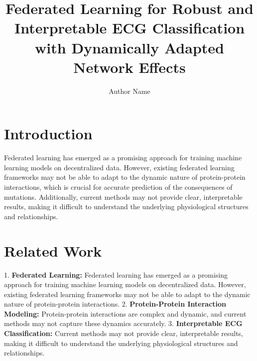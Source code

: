 \documentclass{article}
\begin{document}
\title{Federated Learning for Robust and Interpretable ECG Classification with Dynamically Adapted Network Effects}

\author{Author Name}

\maketitle


\section{Introduction}

Federated learning has emerged as a promising approach for training machine learning models on decentralized data. However, existing federated learning frameworks may not be able to adapt to the dynamic nature of protein-protein interactions, which is crucial for accurate prediction of the consequences of mutations. Additionally, current methods may not provide clear, interpretable results, making it difficult to understand the underlying physiological structures and relationships.

\section{Related Work}

1.  \textbf{Federated Learning:} Federated learning has emerged as a promising approach for training machine learning models on decentralized data. However, existing federated learning frameworks may not be able to adapt to the dynamic nature of protein-protein interactions.
2.  \textbf{Protein-Protein Interaction Modeling:} Protein-protein interactions are complex and dynamic, and current methods may not capture these dynamics accurately.
3.  \textbf{Interpretable ECG Classification:} Current methods may not provide clear, interpretable results, making it difficult to understand the underlying physiological structures and relationships.
\end{document}
